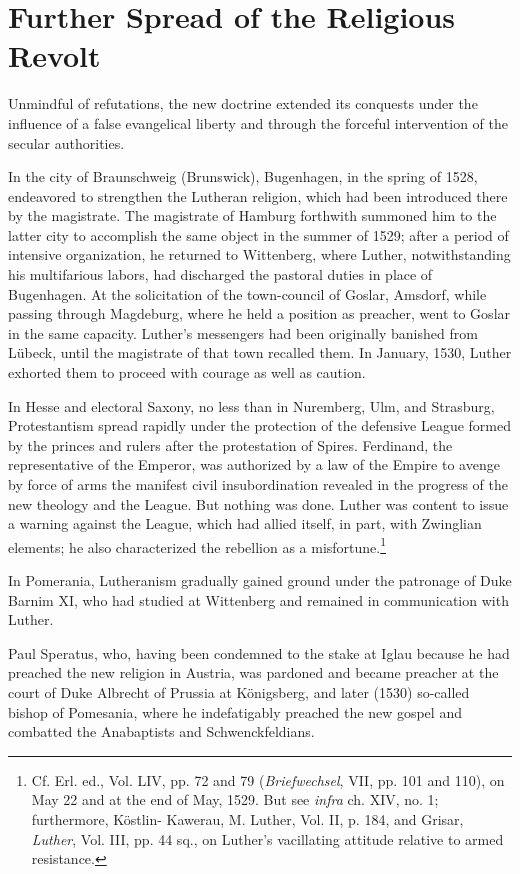 \section{Further Spread of the Religious Revolt}

Unmindful of refutations, the new doctrine extended its conquests
under the influence of a false evangelical liberty and through the
forceful intervention of the secular authorities.

In the city of Braunschweig (Brunswick), Bugenhagen, in the
spring of 1528, endeavored to strengthen the Lutheran religion,
which had been introduced there by the magistrate. The magistrate
of Hamburg forthwith summoned him to the latter city to accomplish the
same object in the summer of 1529; after a period of intensive
organization, he returned to Wittenberg, where Luther, notwithstanding
his multifarious labors, had discharged the pastoral duties
in place of Bugenhagen. At the solicitation of the town-council of
Goslar, Amsdorf, while passing through Magdeburg, where he held
a position as preacher, went to Goslar in the same capacity. Luther’s
messengers had been originally banished from Lübeck, until the magistrate
of that town recalled them. In January, 1530, Luther exhorted
them to proceed with courage as well as caution.

In Hesse and electoral Saxony, no less than in Nuremberg, Ulm,
and Strasburg, Protestantism spread rapidly under the protection of
the defensive League formed by the princes and rulers after the protestation
of Spires. Ferdinand, the representative of the Emperor,
was authorized by a law of the Empire to avenge by force of arms the
manifest civil insubordination revealed in the progress of the new theology
and the League. But nothing was done. Luther was content to
issue a warning against the League, which had allied itself, in part,
with Zwinglian elements; he also characterized the rebellion as a
misfortune.\footnote {Cf. Erl. ed., Vol. LIV, pp. 72 and 79
(\textit{Briefwechsel}, VII, pp. 101 and 110), on May 22 and at the end of
May, 1529. But see \textit{infra} ch. XIV, no. 1; furthermore, Köstlin-
Kawerau, M. Luther, Vol. II, p. 184, and Grisar, \textit{Luther}, Vol. III,
pp. 44 sq., on Luther’s vacillating attitude relative to armed resistance.}

In Pomerania, Lutheranism gradually gained ground under the
patronage of Duke Barnim XI, who had studied at Wittenberg
and remained in communication with Luther.

Paul Speratus, who, having been condemned to the stake at Iglau
because he had preached the new religion in Austria, was pardoned
and became preacher at the court of Duke Albrecht of Prussia at
Königsberg, and later (1530) so-called bishop of Pomesania, where
he indefatigably preached the new gospel and combatted the Anabaptists
and Schwenckfeldians.

